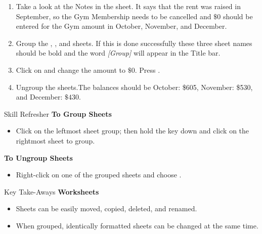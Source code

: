 \begin{enumerate}
	\item Take a look at the Notes in the  sheet. It says that the rent was raised in September, so the Gym Membership needs to be cancelled and $ \$0 $ should be entered for the Gym amount in October, November, and December.
	\item Group the , , and  sheets. If this is done successfully these three sheet names should be bold and the word \textit{[Group]} will appear in the Title bar.
	\item Click on  and change the amount to $ \$0 $. Press .
	\item Ungroup the sheets.The balances should be October: \$605, November: \$530, and December: $ \$430 $.
\end{enumerate}

\begin{center}
	\begin{sklbox}{Skill Refresher}
		\textbf{To Group Sheets}
		\\
		\begin{itemize}
			\setlength{\itemsep}{0pt}
			\setlength{\parskip}{0pt}
			\setlength{\parsep}{0pt}
			
			\item Click on the leftmost sheet group; then hold the  key down and click on the rightmost sheet to group.
		\end{itemize}
			
		\bigskip
			
		\textbf{To Ungroup Sheets}
		\begin{itemize}
			\setlength{\itemsep}{0pt}
			\setlength{\parskip}{0pt}
			\setlength{\parsep}{0pt}
			
			\item Right-click on one of the grouped sheets and choose .
		\end{itemize}
	\end{sklbox}
\end{center}

\begin{center}
	\begin{tkwbox}{Key Take-Aways}
		\textbf{Worksheets}
		\\
		\begin{itemize}
			\setlength{\itemsep}{0pt}
			\setlength{\parskip}{0pt}
			\setlength{\parsep}{0pt}
			
			\item Sheets can be easily moved, copied, deleted, and renamed.
			\item When grouped, identically formatted sheets can be changed at the same time.
			
		\end{itemize}
	\end{tkwbox}
\end{center}

